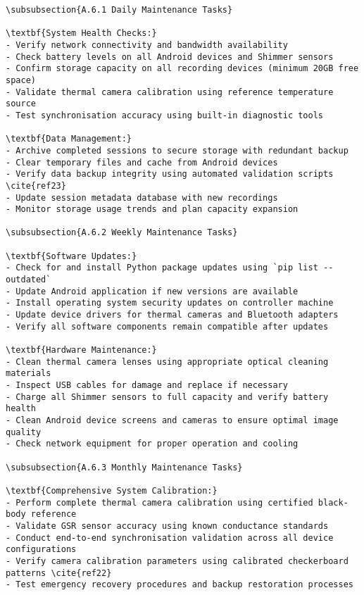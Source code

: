 \begin{verbatim}
\subsubsection{A.6.1 Daily Maintenance Tasks}

\textbf{System Health Checks:}
- Verify network connectivity and bandwidth availability
- Check battery levels on all Android devices and Shimmer sensors
- Confirm storage capacity on all recording devices (minimum 20GB free space)
- Validate thermal camera calibration using reference temperature source
- Test synchronisation accuracy using built-in diagnostic tools

\textbf{Data Management:}
- Archive completed sessions to secure storage with redundant backup
- Clear temporary files and cache from Android devices
- Verify data backup integrity using automated validation scripts \cite{ref23}
- Update session metadata database with new recordings
- Monitor storage usage trends and plan capacity expansion

\subsubsection{A.6.2 Weekly Maintenance Tasks}

\textbf{Software Updates:}
- Check for and install Python package updates using `pip list --outdated`
- Update Android application if new versions are available
- Install operating system security updates on controller machine
- Update device drivers for thermal cameras and Bluetooth adapters
- Verify all software components remain compatible after updates

\textbf{Hardware Maintenance:}
- Clean thermal camera lenses using appropriate optical cleaning materials
- Inspect USB cables for damage and replace if necessary
- Charge all Shimmer sensors to full capacity and verify battery health
- Clean Android device screens and cameras to ensure optimal image quality
- Check network equipment for proper operation and cooling

\subsubsection{A.6.3 Monthly Maintenance Tasks}

\textbf{Comprehensive System Calibration:}
- Perform complete thermal camera calibration using certified black-body reference
- Validate GSR sensor accuracy using known conductance standards
- Conduct end-to-end synchronisation validation across all device configurations
- Verify camera calibration parameters using calibrated checkerboard patterns \cite{ref22}
- Test emergency recovery procedures and backup restoration processes


\end{verbatim}
